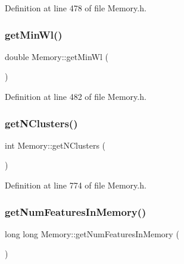 Definition at line 478 of file Memory.\+h.

\mbox{\label{class_memory_a8af1be617551d77f7356e2d10f796af1}} 
\subsubsection{\texorpdfstring{get\+Min\+Wl()}{getMinWl()}}
{\footnotesize\ttfamily double Memory\+::get\+Min\+Wl (\begin{DoxyParamCaption}{ }\end{DoxyParamCaption})\hspace{0.3cm}{\ttfamily [inline]}}



Definition at line 482 of file Memory.\+h.

\mbox{\label{class_memory_aacaf803387738204131008c1a0658fa2}} 
\subsubsection{\texorpdfstring{get\+N\+Clusters()}{getNClusters()}}
{\footnotesize\ttfamily int Memory\+::get\+N\+Clusters (\begin{DoxyParamCaption}{ }\end{DoxyParamCaption})\hspace{0.3cm}{\ttfamily [inline]}}



Definition at line 774 of file Memory.\+h.

\mbox{\label{class_memory_ae5b168514b6b6bf8121526a6216a8b4e}} 
\subsubsection{\texorpdfstring{get\+Num\+Features\+In\+Memory()}{getNumFeaturesInMemory()}}
{\footnotesize\ttfamily long long Memory\+::get\+Num\+Features\+In\+Memory (\begin{DoxyParamCaption}{ }\end{DoxyParamCaption})\hspace{0.3cm}{\ttfamily [inline]}}



